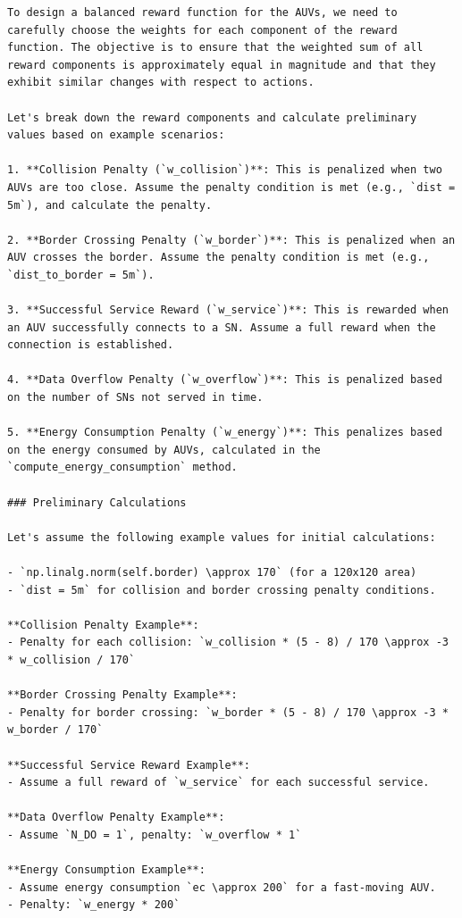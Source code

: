 \documentclass{article}
\begin{document}
\begin{verbatim}
To design a balanced reward function for the AUVs, we need to carefully choose the weights for each component of the reward function. The objective is to ensure that the weighted sum of all reward components is approximately equal in magnitude and that they exhibit similar changes with respect to actions.

Let's break down the reward components and calculate preliminary values based on example scenarios:

1. **Collision Penalty (`w_collision`)**: This is penalized when two AUVs are too close. Assume the penalty condition is met (e.g., `dist = 5m`), and calculate the penalty.

2. **Border Crossing Penalty (`w_border`)**: This is penalized when an AUV crosses the border. Assume the penalty condition is met (e.g., `dist_to_border = 5m`).

3. **Successful Service Reward (`w_service`)**: This is rewarded when an AUV successfully connects to a SN. Assume a full reward when the connection is established.

4. **Data Overflow Penalty (`w_overflow`)**: This is penalized based on the number of SNs not served in time.

5. **Energy Consumption Penalty (`w_energy`)**: This penalizes based on the energy consumed by AUVs, calculated in the `compute_energy_consumption` method.

### Preliminary Calculations

Let's assume the following example values for initial calculations:

- `np.linalg.norm(self.border) \approx 170` (for a 120x120 area)
- `dist = 5m` for collision and border crossing penalty conditions.

**Collision Penalty Example**:
- Penalty for each collision: `w_collision * (5 - 8) / 170 \approx -3 * w_collision / 170`

**Border Crossing Penalty Example**:
- Penalty for border crossing: `w_border * (5 - 8) / 170 \approx -3 * w_border / 170`

**Successful Service Reward Example**:
- Assume a full reward of `w_service` for each successful service.

**Data Overflow Penalty Example**:
- Assume `N_DO = 1`, penalty: `w_overflow * 1`

**Energy Consumption Example**:
- Assume energy consumption `ec \approx 200` for a fast-moving AUV.
- Penalty: `w_energy * 200`


\end{verbatim}
\end{document}
